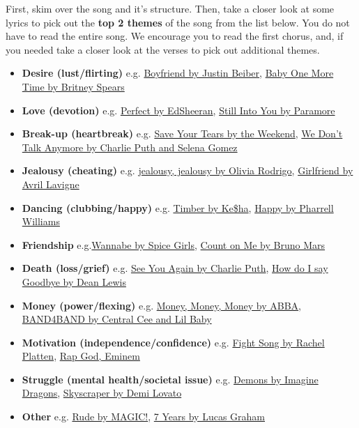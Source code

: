\documentclass{article}
\begin{document}
First, skim over the song and it's structure. Then, take a closer look at some lyrics to pick out the \textbf{top 2 themes} of the song from the list below. You do not have to read the entire song. We encourage you to read the first chorus, and, if you needed take a closer look at the verses to pick out additional themes.


\begin{itemize}
    \item \textbf{Desire (lust/flirting)} e.g. \href{https://www.youtube.com/watch?v=xYoxBQ03wUQ}{Boyfriend by Justin Beiber}, \href{https://www.youtube.com/watch?v=C-u5WLJ9Yk4}{Baby One More Time by Britney Spears}
    \item \textbf{Love (devotion)} e.g. \href{https://www.youtube.com/watch?v=2Vv-BfVoq4g}{Perfect by EdSheeran}, \href{https://www.youtube.com/watch?v=OblL026SvD4}{Still Into You by Paramore}
    \item \textbf{Break-up (heartbreak)} e.g. \href{https://www.youtube.com/watch?v=XXYlFuWEuKI}{Save Your Tears by the Weekend}, \href{https://www.youtube.com/watch?v=3AtDnEC4zak}{We Don't Talk Anymore by Charlie Puth and Selena Gomez}
    \item \textbf{Jealousy (cheating)} e.g. \href{https://www.youtube.com/watch?v=Z-9gQjUZMm0}{jealousy, jealousy by Olivia Rodrigo}, \href{https://www.youtube.com/watch?v=Bg59q4puhmg}{Girlfriend by Avril Lavigne} 
     \item \textbf{Dancing (clubbing/happy)} e.g. \href{https://www.youtube.com/watch?v=hHUbLv4ThOo}{Timber by Ke\$ha}, \href{https://www.youtube.com/watch?v=ZbZSe6N_BXs}{Happy by Pharrell Williams}
    \item \textbf{Friendship} e.g.\href{https://www.youtube.com/watch?v=gJLIiF15wjQ}{Wannabe by Spice Girls}, \href{https://www.youtube.com/watch?v=6k8cpUkKK4c}{Count on Me by Bruno Mars}
    \item \textbf{Death (loss/grief)} e.g. \href{https://www.youtube.com/watch?v=RgKAFK5djSk}{See You Again by Charlie Puth}, \href{https://www.youtube.com/watch?v=QCtEe-zsCtQ&list=RDQMC5eUFF-35-k&index=9}{How do I say Goodbye by Dean Lewis}
    \item \textbf{Money (power/flexing)} e.g. \href{https://www.youtube.com/watch?v=ETxmCCsMoD0}{Money, Money, Money by ABBA}, \href{https://www.youtube.com/watch?v=pDddlvCfTiw}{BAND4BAND by Central Cee and Lil Baby}
    \item \textbf{Motivation (independence/confidence)} e.g. \href{https://www.youtube.com/watch?v=xo1VInw-SKc}{Fight Song by Rachel Platten}, \href{https://www.youtube.com/watch?v=XbGs_qK2PQA}{Rap God, Eminem}
    \item \textbf{Struggle (mental health/societal issue)} e.g. \href{https://www.youtube.com/watch?v=mWRsgZuwf_8}{Demons by Imagine Dragons}, \href{https://www.youtube.com/watch?v=r_8ydghbGSg}{Skyscraper by Demi Lovato}
    \item \textbf{Other} e.g. \href{https://www.youtube.com/watch?v=PIh2xe4jnpk}{Rude by MAGIC!}, \href{https://www.youtube.com/watch?v=LHCob76kigA}{7 Years by Lucas Graham}
\end{itemize}
\end{document}

